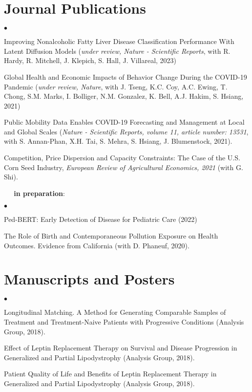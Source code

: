 \documentclass[margin,line]{res}                          %
\newenvironment{list2}{
  \begin{list}{$\bullet$}{%
      \setlength{\itemsep}{0in}
      \setlength{\parsep}{0in} \setlength{\parskip}{0in}
      \setlength{\topsep}{0in} \setlength{\partopsep}{0in} 
      \setlength{\leftmargin}{0.2in}}}{\end{list}}
\begin{document}
\begin{resume}
\section{\sc Journal Publications}
\begin{list2}
\item[]Improving Nonalcoholic Fatty Liver Disease Classification Performance With Latent Diffusion Models (\textit{under review, Nature - Scientific Reports}, with R. Hardy, R. Mitchell, J. Klepich, S. Hall, J. Villareal, 2023)
\\
\item[] Global Health and Economic Impacts of Behavior Change During the COVID-19 Pandemic (\textit{under review, Nature}, with J. Tseng, K.C. Coy, A.C. Ewing, T. Chong, S.M. Marks, I. Bolliger, N.M. Gonzalez, K. Bell, A.J. Hakim, S. Hsiang,  2021)
\\
\item[] Public Mobility Data Enables COVID-19 Forecasting and Management at Local and Global Scales (\textit{Nature - Scientific Reports, volume 11, article number: 13531}, with S. Annan-Phan, X.H. Tai,  S. Mehra, S. Hsiang, J. Blumenstock, 2021).
\\
\item[] Competition, Price Dispersion and Capacity Constraints: The Case of the U.S. Corn Seed Industry, \textit{European Review of Agricultural Economics, 2021} (with G. Shi).

\end{list2}

$\; \; \; \;$ \textbf{in preparation}:
\begin{list2}
\item[] Ped-BERT: Early Detection of Disease for Pediatric Care (2022)
\\

\item[] The Role of Birth and Contemporaneous Pollution Exposure on Health Outcomes. Evidence from California (with  D. Phaneuf, 2020). 
\\
\end{list2}


\section{\sc Manuscripts and Posters}
\begin{list2}
\item[] Longitudinal Matching. A Method for Generating Comparable Samples of Treatment and Treatment-Naive Patients with Progressive Conditions (Analysis Group, 2018).
\\
\item[] Effect of Leptin Replacement Therapy on Survival and Disease Progression in Generalized and Partial Lipodystrophy (Analysis Group, 2018). 
\\
\item[] Patient Quality of Life and Benefits of Leptin Replacement Therapy in Generalized and Partial Lipodystrophy (Analysis Group, 2018).
\\
\end{list2}



\end{resume}
\end{document}
